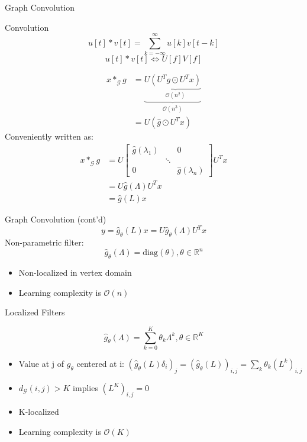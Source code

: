 \documentclass{beamer}
\begin{document}
\begin{frame}{Graph Convolution}
  \footnotesize{
    \begin{block}{Convolution}
      \[u[t]\ast v[t]=\sum _{ k=-\infty  }^{ \infty  }{ u[k] v[t-k] }\]
      \[u[t]\ast v[t] \Leftrightarrow U[f]V[f]\]
    \end{block}
    \vspace{-0.6cm}
  \begin{align*}
    x\ast _{ \mathcal{G} }g &= \underbrace{U\underbrace { (U^Tg \odot U^Tx) }_{\mathcal{O}(n^2)}}_{\mathcal{O}(n^3)}  \\
    &=U(\hat{g} \odot U^Tx)
  \end{align*}
  Conveniently written as:
  \begin{align*}
    x \ast_{\mathcal{G}} g &= U\begin{bmatrix} \hat{g}(\lambda _{ 1 }) &  & 0 \\  & \ddots  &  \\ 0 &  & \hat{g}({\lambda _{ n }}) \end{bmatrix} U^Tx\\
    &= U \hat{g}(\Lambda)U^Tx \\
    &= \hat{g}(L)x
  \end{align*}
  }
\end{frame}
\begin{frame}{Graph Convolution (cont'd)}
  \[
  y = \hat{g}_{\theta}(L)x = U\hat{g}_{\theta}(\Lambda)U^Tx
  \]
  Non-parametric filter:
  \[
  \hat{g}_{\theta}(\Lambda) = \text{diag}(\theta), \theta \in \mathbb{R}^n
  \]
  \begin{itemize}
  \item Non-localized in vertex domain
  \item Learning complexity is $\mathcal{O}(n)$
  \end{itemize}
\end{frame}
\begin{frame}{Localized Filters}
  \begin{figure}
    \[
    \hat{g}_{\theta}(\Lambda) = \sum _{ k=0 }^{ K}{\theta_k\Lambda^k  }, \theta \in \mathbb{R}^K
    \]
    \caption*{\cite{hammond2011wavelets}}
  \end{figure}
  \begin{itemize}
  \item Value at j of $g_\theta$ centered at i: $(\hat{g}_\theta(L)\delta_i)_j = (\hat{g}_\theta(L))_{i,j}=\sum_{k}^{}{\theta_k(L^k)_{i,j}}$
  \item $d_\mathcal{G}(i,j)>K$ implies $(L^K)_{i,j}=0$
  \item K-localized
  \item Learning complexity is $\mathcal{O}(K)$
  \end{itemize}
\end{frame}
\end{document}
